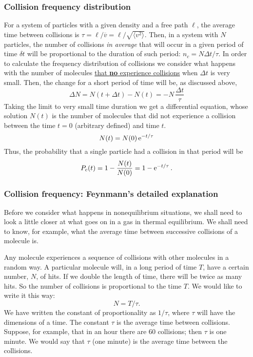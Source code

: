 \begin{subappendices}
\subsubsection{Collision frequency distribution}

For a system of particles with a given density and a free path $\ell$, the average time between collisions is $\tau = \ell/\overline{v}= \ell/ \sqrt{\langle v^{2} \rangle}$. Then, in a system with $N$ particles, the number of collisions \emph{in average} that will occur in a given period of time $\delta t$ will be proportional to the duration of such period: $n_{c} = N \Delta t/\tau$. In order to calculate the frequency distribution of collisions we consider what happens with the number of molecules \underline{that \textbf{no} experience collisions} when $\Delta t$ is very small. Then, the change for a short period of time will be, as discussed above,
\begin{equation}
  \label{Q:rates-freq-collision-diff}
  \Delta N = N(t+\Delta t) - N(t) = - N \, \frac{\Delta t}{\tau}
\end{equation}
Taking the limit to very small time duration we get a differential equation, whose solution $N(t)$ is the number of molecules that did not experience a collision between the time $t=0$ (arbitrary defined) and time $t$. 
\begin{equation}
  \label{Q:rates-freq-collision-no-col}
  N(t) = N(0)\, \mathrm{e}^{-t/\tau}
\end{equation}
Thus, the probability that a single particle had a collision in that period will be 
\begin{equation}
  \label{Q:rates-freq-collision-prob-dist}
  P_{c}(t) = 1- \frac{N(t)}{N(0)} = 1 - \mathrm{e}^{-t/\tau} \,.
\end{equation}


\subsubsection{Collision frequency: Feynmann's detailed explanation}

Before we consider what happens in nonequilibrium situations, we shall need to look a little closer at what goes on in a gas in thermal equilibrium. We shall need to know, for example, what the average time between successive collisions of a molecule is.

Any molecule experiences a sequence of collisions with other molecules in a random way. A particular molecule will, in a long period of time $T$, have a certain number, $N$, of hits. If we double the length of time, there will be twice as many hits. So the number of collisions is proportional to the time $T$. We would like to write it this way:
\begin{equation} \label{Q:rates-time}
  N = T/\tau.
\end{equation}
%
We have written the constant of proportionality as $1/\tau$, where $\tau$ will have the dimensions of a time. The constant $\tau$ is the average time between collisions. Suppose, for example, that in an hour there are 60 collisions; then $\tau$ is one minute. We would say that $\tau$ (one minute) is the average time between the collisions.


\end{subappendices}

